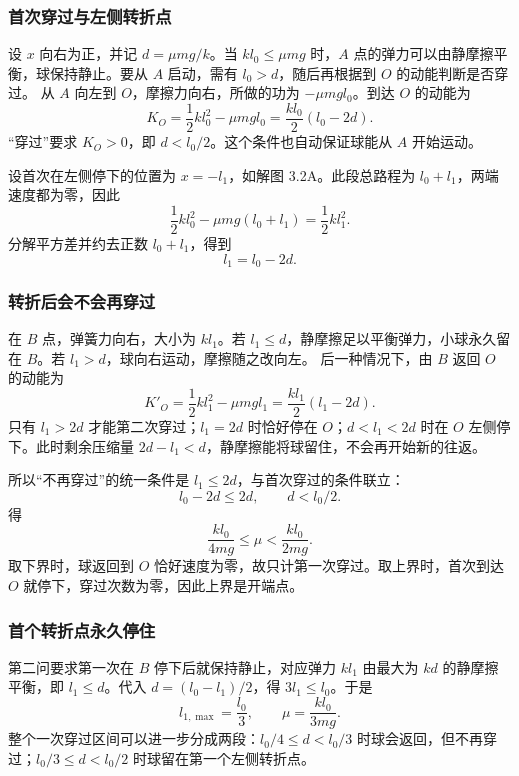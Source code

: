 \documentclass[UTF8,fontset=fandol,a4paper,11pt]{ctexart}
\begin{document}
\subsubsection*{首次穿过与左侧转折点}
设 $x$ 向右为正，并记 $d=\mu mg/k$。当 $kl_0\leq\mu mg$ 时，$A$ 点的弹力可以由静摩擦平衡，球保持静止。要从 $A$ 启动，需有 $l_0>d$，随后再根据到 $O$ 的动能判断是否穿过。
从 $A$ 向左到 $O$，摩擦力向右，所做的功为 $-\mu mgl_0$。到达 $O$ 的动能为
\[
K_O=\frac12kl_0^2-\mu mgl_0
 =\frac{k l_0}{2}(l_0-2d).
\]
“穿过”要求 $K_O>0$，即 $d<l_0/2$。这个条件也自动保证球能从 $A$ 开始运动。

设首次在左侧停下的位置为 $x=-l_1$，如解图 3.2A。此段总路程为 $l_0+l_1$，两端速度都为零，因此
\[
\frac12kl_0^2-\mu mg(l_0+l_1)=\frac12kl_1^2.
\]
分解平方差并约去正数 $l_0+l_1$，得到
\[
\boxed{l_1=l_0-2d}.
\]

\subsubsection*{转折后会不会再穿过}
在 $B$ 点，弹簧力向右，大小为 $kl_1$。若 $l_1\leq d$，静摩擦足以平衡弹力，小球永久留在 $B$。若 $l_1>d$，球向右运动，摩擦随之改向左。
后一种情况下，由 $B$ 返回 $O$ 的动能为
\[
K'_O=\frac12kl_1^2-\mu mgl_1
=\frac{k l_1}{2}(l_1-2d).
\]
只有 $l_1>2d$ 才能第二次穿过；$l_1=2d$ 时恰好停在 $O$；$d<l_1<2d$ 时在 $O$ 左侧停下。此时剩余压缩量 $2d-l_1<d$，静摩擦能将球留住，不会再开始新的往返。

所以“不再穿过”的统一条件是 $l_1\leq2d$，与首次穿过的条件联立：
\[
l_0-2d\leq2d,\qquad d<l_0/2.
\]
得
\[
\boxed{\frac{kl_0}{4mg}\leq\mu<\frac{kl_0}{2mg}}.
\]
取下界时，球返回到 $O$ 恰好速度为零，故只计第一次穿过。取上界时，首次到达 $O$ 就停下，穿过次数为零，因此上界是开端点。

\subsubsection*{首个转折点永久停住}
第二问要求第一次在 $B$ 停下后就保持静止，对应弹力 $kl_1$ 由最大为 $kd$ 的静摩擦平衡，即 $l_1\leq d$。代入 $d=(l_0-l_1)/2$，得 $3l_1\leq l_0$。于是
\[
\boxed{l_{1,\max}=\frac{l_0}{3}},\qquad
\boxed{\mu=\frac{kl_0}{3mg}}.
\]
整个一次穿过区间可以进一步分成两段：$l_0/4\leq d<l_0/3$ 时球会返回，但不再穿过；$l_0/3\leq d<l_0/2$ 时球留在第一个左侧转折点。
\end{document}
